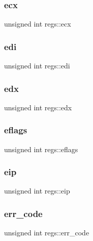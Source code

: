 \subsubsection{\texorpdfstring{ecx}{ecx}}
{\footnotesize\ttfamily unsigned int regs\+::ecx}

\mbox{\label{structregs_a273e21e568ee550e48dfc2799e5e7d56}} 
\subsubsection{\texorpdfstring{edi}{edi}}
{\footnotesize\ttfamily unsigned int regs\+::edi}

\mbox{\label{structregs_a5177b6604bc2937159c29899a0a6b94a}} 
\subsubsection{\texorpdfstring{edx}{edx}}
{\footnotesize\ttfamily unsigned int regs\+::edx}

\mbox{\label{structregs_a2394860816e82786acb64671237492b2}} 
\subsubsection{\texorpdfstring{eflags}{eflags}}
{\footnotesize\ttfamily unsigned int regs\+::eflags}

\mbox{\label{structregs_a483d469ae6b388e4df869c1ebd61d713}} 
\subsubsection{\texorpdfstring{eip}{eip}}
{\footnotesize\ttfamily unsigned int regs\+::eip}

\mbox{\label{structregs_a37177085b61efd8c7d777880ed814ffe}} 
\subsubsection{\texorpdfstring{err\+\_\+code}{err\_code}}
{\footnotesize\ttfamily unsigned int regs\+::err\+\_\+code}

